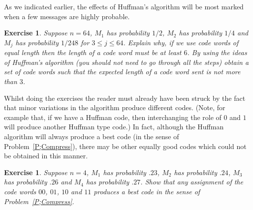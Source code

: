 \documentclass[12pt,a4paper]{article}
\theoremstyle{plain}
\newtheorem{exercise}[theorem]{Exercise}
\theoremstyle{definition}
\begin{document}
    As we indicated earlier, the effects of Huffman's algorithm
    will be most marked when a few messages are highly
    probable.
    \begin{exercise}
        \label{E;Huffman 2} Suppose $n=64$,
        $M_{1}$ has probability $1/2$,
        $M_{2}$ has probability $1/4$ and $M_{j}$ has probability
        $1/248$ for $3\leq j\leq 64$.
        Explain why, if we use code words of equal length
        then the length of a code word must be at least $6$.
        By using the ideas of Huffman's algorithm (you should not
        need to go through all the steps) obtain a set of
        code words such that the \emph{expected} length of a code word
        sent is not more than $3$.
    \end{exercise}

    Whilst doing the exercises the reader must already
    have been struck by the fact that minor variations
    in the algorithm produce different codes. (Note, for example
    that, if we have a Huffman code, then interchanging the role of
    $0$ and $1$ will produce another Huffman type code.)
    In fact, although the Huffman algorithm will always
    produce a best code (in the sense of Problem~\ref{P;Compress}),
    there may be other equally good codes which could not
    be obtained in this manner.
    \begin{exercise}
        \label{E;Huffman 3} Suppose $n=4$,
        $M_{1}$ has probability $.23$,
        $M_{2}$ has probability $.24$,
        $M_{3}$ has probability $.26$
        and $M_{4}$ has probability $.27$. Show that any
        assignment of the code words $00$, $01$, $10$
        and $11$ produces a best code in the sense of Problem~\ref{P;Compress}.
    \end{exercise}
\end{document}
